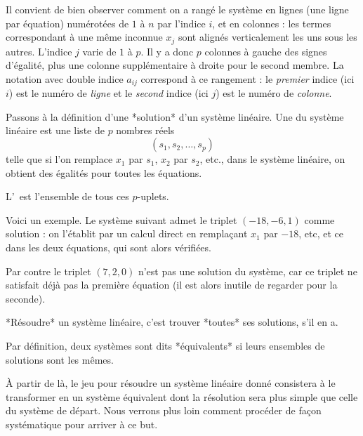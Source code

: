 Il convient de bien observer comment on a rangé le système en lignes 
(une ligne par équation) numérotées de $1$ à $n$ par l'indice $i$, et en colonnes : 
les termes correspondant à une même inconnue $x_j$ sont alignés verticalement 
les uns sous les autres. L'indice $j$ varie de $1$ à $p$. Il y a donc $p$ colonnes 
à gauche des signes d'égalité, plus une colonne supplémentaire à droite pour le 
second membre. La notation avec double indice $a_{ij}$ correspond à ce rangement : 
le \emph{premier} indice (ici $i$) est le numéro de \emph{ligne} et le \emph{second} 
indice (ici $j$) est le numéro de \emph{colonne}. 

\diapo

Passons à la définition d'une *solution* d'un système linéaire.
Une  du système linéaire est une liste de 
$p$ nombres réels $$(s_1,s_2,\ldots,s_p)$$ telle que si 
l'on remplace $x_1$ par $s_1$, $x_2$ par $s_2$, etc., dans le système 
linéaire, on obtient des égalités pour toutes les équations.

\change

L'\, 
est l'ensemble de tous ces $p$-uplets.

\change

Voici un exemple. Le système suivant admet le triplet $(-18,-6,1)$ comme solution : 
on l'établit par un calcul direct en remplaçant $ x_1$ par $-18$, etc, 
et ce dans les deux équations, qui sont alors vérifiées.

\change

Par contre le triplet $(7,2,0)$ n'est pas une solution du système, 
car ce triplet ne satisfait déjà pas la première équation 
(il est alors inutile de regarder pour la seconde).

\diapo

*Résoudre* un système linéaire, c'est trouver *toutes* ses solutions, s'il en a.

\change

Par définition, deux systèmes sont dits *équivalents* si leurs ensembles de solutions sont les mêmes.

\change


{\`A} partir de là, le jeu pour résoudre un système linéaire 
donné consistera à le transformer en un système équivalent dont 
la résolution sera plus simple que celle du système de départ. 
Nous verrons plus loin comment procéder de façon systématique pour arriver à ce but.

